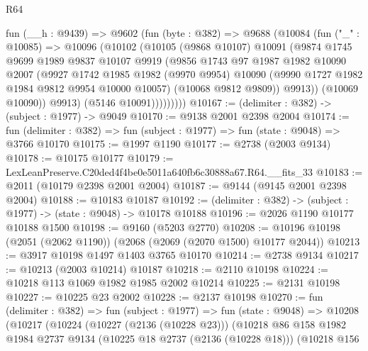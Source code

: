 \begin{lexlean}{R64}
\begin{coremodule}
            fun (__h : @9439) =>
            @9602
              (fun (byte : @382) =>
              @9688
                (@10084
                  (fun ("_" : @10085) =>
                  @10096
                    (@10102
                      (@10105
                        (@9868 @10107)
                        @10091
                        (@9874
                          @1745
                          @9699
                          @1989
                          @9837
                          @10107
                          @9919
                          (@9856
                            @1743
                            @97
                            @1987
                            @1982
                            @10090
                            @2007
                            (@9927
                              @1742
                              @1985
                              @1982
                              (@9970 @9954)
                              @10090
                              (@9990 @1727 @1982 @1984 @9812 @9954 @10000 @10057)
                              (@10068 @9812 @9809))
                            @9913))
                        (@10069 @10090))
                      @9913)
                    (@5146 @10091)))))))))
@10167 := (delimiter : @382) -> (subject : @1977) -> @9049
@10170 := @9138 @2001 @2398 @2004
@10174 := fun (delimiter : @382) => fun (subject : @1977) => fun (state : @9048) => @3766 @10170
@10175 := @1997 @1190
@10177 := @2738 (@2003 @9134)
@10178 := @10175 @10177
@10179 := LexLeanPreserve.C20ded4f4be0e5011a640fb6c30888a67.R64.__fits_33
@10183 := @2011 (@10179 @2398 @2001 @2004)
@10187 := @9144 (@9145 @2001 @2398 @2004)
@10188 := @10183 @10187
@10192 := (delimiter : @382) -> (subject : @1977) -> (state : @9048) -> @10178 @10188
@10196 := @2026 @1190 @10177 @10188 @1500
@10198 := @9160 (@5203 @2770)
@10208 := @10196 @10198 (@2051 (@2062 @1190)) (@2068 (@2069 (@2070 @1500) @10177 @2044))
@10213 := @3917 @10198 @1497 @1403 @3765 @10170
@10214 := @2738 @9134
@10217 := @10213 (@2003 @10214) @10187
@10218 := @2110 @10198
@10224 := @10218 @113 @1069 @1982 @1985 @2002 @10214
@10225 := @2131 @10198
@10227 := @10225 @23 @2002
@10228 := @2137 @10198
@10270 := fun (delimiter : @382) =>
  fun (subject : @1977) =>
  fun (state : @9048) =>
  @10208
    (@10217
      (@10224
        (@10227 (@2136 (@10228 @23)))
        (@10218
          @86
          @158
          @1982
          @1984
          @2737
          @9134
          (@10225 @18 @2737 (@2136 (@10228 @18)))
          (@10218
            @156

\end{coremodule}
\end{lexlean}
